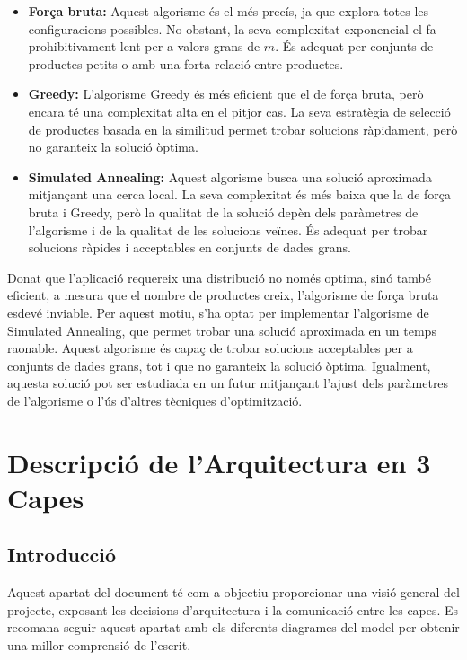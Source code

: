 \documentclass[a4paper,12pt]{report}
\begin{document}
\begin{itemize}
\begin{itemize}
	\item \textbf{Força bruta:} Aquest algorisme és el més precís, ja que explora totes les configuracions possibles. No obstant, la seva complexitat exponencial el fa prohibitivament lent per a valors grans de \(m\). És adequat per conjunts de productes petits o amb una forta relació entre productes.
	\item \textbf{Greedy:} L'algorisme Greedy és més eficient que el de força bruta, però encara té una complexitat alta en el pitjor cas. La seva estratègia de selecció de productes basada en la similitud permet trobar solucions ràpidament, però no garanteix la solució òptima.
	\item \textbf{Simulated Annealing:} Aquest algorisme busca una solució aproximada mitjançant una cerca local. La seva complexitat és més baixa que la de força bruta i Greedy, però la qualitat de la solució depèn dels paràmetres de l'algorisme i de la qualitat de les solucions veïnes. És adequat per trobar solucions ràpides i acceptables en conjunts de dades grans.
\end{itemize}

Donat que l'aplicació requereix una distribució no només optima, sinó també eficient, a mesura que el nombre de productes creix, l'algorisme de força bruta esdevé inviable. Per aquest motiu, s'ha optat per implementar l'algorisme de Simulated Annealing, que permet trobar una solució aproximada en un temps raonable. Aquest algorisme és capaç de trobar solucions acceptables per a conjunts de dades grans, tot i que no garanteix la solució òptima. Igualment, aquesta solució pot ser estudiada en un futur mitjançant l'ajust dels paràmetres de l'algorisme o l'ús d'altres tècniques d'optimització.

\chapter{Descripció de l'Arquitectura en 3 Capes}

\section{Introducció}

Aquest apartat del document té com a objectiu proporcionar una visió general del projecte, exposant les decisions d'arquitectura i la comunicació entre les capes. Es recomana seguir aquest apartat amb els diferents diagrames del model per obtenir una millor comprensió de l'escrit.


\end{itemize}
\end{document}
